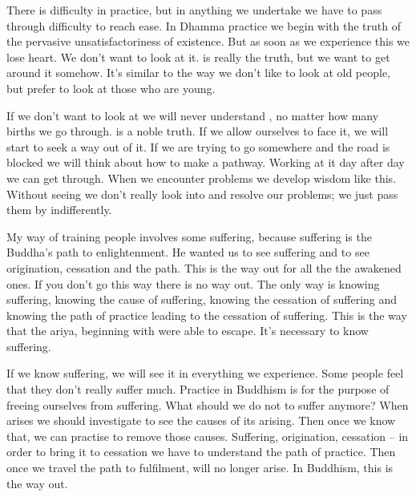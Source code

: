 There is difficulty in practice, but in anything we undertake we have to pass through difficulty to reach ease. In Dhamma practice we begin with the truth of  the pervasive unsatisfactoriness of existence. But as soon as we experience this we lose heart. We don't want to look at it.  is really the truth, but we want to get around it somehow. It's similar to the way we don't like to look at old people, but prefer to look at those who are young. 

If we don't want to look at  we will never understand , no matter how many births we go through.  is a noble truth. If we allow ourselves to face it, we will start to seek a way out of it. If we are trying to go somewhere and the road is blocked we will think about how to make a pathway. Working at it day after day we can get through. When we encounter problems we develop wisdom like this. Without seeing  we don't really look into and resolve our problems; we just pass them by indifferently. 

My way of training people involves some suffering, because suffering is the Buddha's path to enlightenment. He wanted us to see suffering and to see origination, cessation and the path. This is the way out for all the  the awakened ones. If you don't go this way there is no way out. The only way is knowing suffering, knowing the cause of suffering, knowing the cessation of suffering and knowing the path of practice leading to the cessation of suffering. This is the way that the ariya, beginning with  were able to escape. It's necessary to know suffering. 

If we know suffering, we will see it in everything we experience. Some people feel that they don't really suffer much. Practice in Buddhism is for the purpose of freeing ourselves from suffering. What should we do not to suffer anymore? When  arises we should investigate to see the causes of its arising. Then once we know that, we can practise to remove those causes. Suffering, origination, cessation -- in order to bring it to cessation we have to understand the path of practice. Then once we travel the path to fulfilment,  will no longer arise. In Buddhism, this is the way out. 

